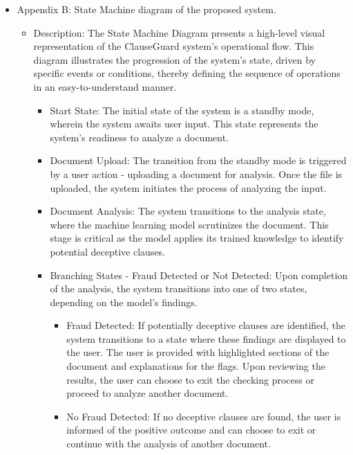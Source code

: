 \begin{itemize}
\begin{itemize}
\begin{itemize}
            \end{itemize}
    \end{itemize}

    \item Appendix B: State Machine diagram of the proposed system. 
        \begin{itemize}
            \item Description: The State Machine Diagram presents a high-level visual representation of the ClauseGuard system's operational flow. This diagram illustrates the progression of the system's state, driven by specific events or conditions, thereby defining the sequence of operations in an easy-to-understand manner.
            \begin{itemize}
                \item Start State: The initial state of the system is a standby mode, wherein the system awaits user input. This state represents the system's readiness to analyze a document.
                \item Document Upload: The transition from the standby mode is triggered by a user action - uploading a document for analysis. Once the file is uploaded, the system initiates the process of analyzing the input.
                \item Document Analysis: The system transitions to the analysis state, where the machine learning model scrutinizes the document. This stage is critical as the model applies its trained knowledge to identify potential deceptive clauses.
                \item Branching States - Fraud Detected or Not Detected: Upon completion of the analysis, the system transitions into one of two states, depending on the model's findings.
                \begin{itemize}
                    \item Fraud Detected: If potentially deceptive clauses are identified, the system transitions to a state where these findings are displayed to the user. The user is provided with highlighted sections of the document and explanations for the flags. Upon reviewing the results, the user can choose to exit the checking process or proceed to analyze another document.
                    \item No Fraud Detected: If no deceptive clauses are found, the user is informed of the positive outcome and can choose to exit or continue with the analysis of another document.
                    

\end{itemize}
\end{itemize}
\end{itemize}
\end{itemize}

